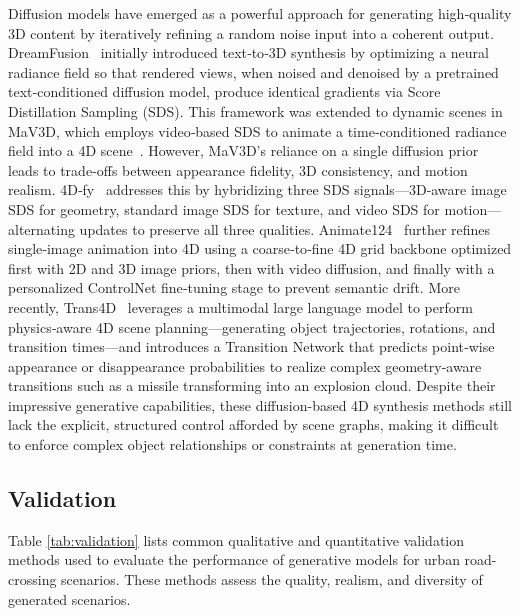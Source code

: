 \documentclass{article}
\begin{document}
Diffusion models have emerged as a powerful approach for generating high‐quality 3D content by iteratively refining a random noise input into a coherent output. DreamFusion~\cite{poole2022dreamfusion} initially introduced text‐to‐3D synthesis by optimizing a neural radiance field so that rendered views, when noised and denoised by a pretrained text‐conditioned diffusion model, produce identical gradients via Score Distillation Sampling (SDS). This framework was extended to dynamic scenes in MaV3D, which employs video‐based SDS to animate a time‐conditioned radiance field into a 4D scene~\cite{singer2023text}. However, MaV3D’s reliance on a single diffusion prior leads to trade‐offs between appearance fidelity, 3D consistency, and motion realism. 4D‐fy~\cite{bahmani20244d} addresses this by hybridizing three SDS signals—3D‐aware image SDS for geometry, standard image SDS for texture, and video SDS for motion—alternating updates to preserve all three qualities. Animate124~\cite{zhao2023animate124} further refines single‐image animation into 4D using a coarse‐to‐fine 4D grid backbone optimized first with 2D and 3D image priors, then with video diffusion, and finally with a personalized ControlNet fine‐tuning stage to prevent semantic drift. More recently, Trans4D~\cite{zeng2024trans4d} leverages a multimodal large language model to perform physics‐aware 4D scene planning—generating object trajectories, rotations, and transition times—and introduces a Transition Network that predicts point‐wise appearance or disappearance probabilities to realize complex geometry‐aware transitions such as a missile transforming into an explosion cloud. Despite their impressive generative capabilities, these diffusion-based 4D synthesis methods still lack the explicit, structured control afforded by scene graphs, making it difficult to enforce complex object relationships or constraints at generation time.

\subsection{Validation}

Table \ref{tab:validation} lists common qualitative and quantitative validation methods used to evaluate the performance of generative models for urban road-crossing scenarios. These methods assess the quality, realism, and diversity of generated scenarios.
\end{document}
